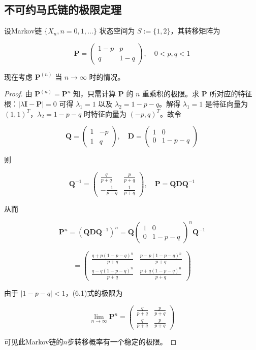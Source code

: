 \documentclass[lang=cn,10pt,thmcnt=section]{elegantbook}
\begin{document}
\subsection{不可约马氏链的极限定理}
\begin{example}
	设Markov链 \(\{X_n, n = 0, 1, \ldots\}\) 状态空间为 \( S := \{1, 2\} \)，其转移矩阵为

\[
\mathbf{P} = \left(
\begin{array}{cc}
1-p & p \\
q & 1-q
\end{array}
\right), \quad 0 < p, q < 1
\]

现在考虑 \(\mathbf{P}^{(n)}\) 当 \(n \to \infty\) 时的情况。

\end{example}
\begin{proof}
	由 \(\mathbf{P}^{(n)} = \mathbf{P}^n\) 知，只需计算 \(\mathbf{P}\) 的 \(n\) 重乘积的极限。求 \(\mathbf{P}\) 所对应的特征根：\(|\lambda \mathbf{I} - \mathbf{P}| = 0\) 可得 \(\lambda_1 = 1\) 以及 \(\lambda_2 = 1 - p - q\)。解得 \(\lambda_1 = 1\) 是特征向量为 \((1, 1)^T\)，\(\lambda_2 = 1 - p - q\) 时特征向量为 \((-p, q)^T\)。故令

\[
\mathbf{Q} = \left(
\begin{array}{cc}
1 & -p \\
1 & q
\end{array}
\right), \quad
\mathbf{D} = \left(
\begin{array}{cc}
1 & 0 \\
0 & 1 - p - q
\end{array}
\right)
\]

则

\[
\mathbf{Q}^{-1} = \left(
\begin{array}{cc}
\frac{q}{p+q} & \frac{p}{p+q} \\
-\frac{1}{p+q} & \frac{1}{p+q}
\end{array}
\right), \quad
\mathbf{P} = \mathbf{Q} \mathbf{D} \mathbf{Q}^{-1}
\]

从而

\[
\mathbf{P}^n = (\mathbf{Q} \mathbf{D} \mathbf{Q}^{-1})^n = \mathbf{Q} \left(
\begin{array}{cc}
1 & 0 \\
0 & 1 - p - q
\end{array}
\right)^n \mathbf{Q}^{-1}
\]

\[
= \left(
\begin{array}{cc}
\frac{q + p(1-p-q)^n}{p+q} & \frac{p - p(1-p-q)^n}{p+q} \\
\frac{q - q(1-p-q)^n}{p+q} & \frac{p + q(1-p-q)^n}{p+q}
\end{array}
\right)
\]

由于 \(|1 - p - q| < 1\)，(6.1)式的极限为

\[
\lim_{n \to \infty} \mathbf{P}^n = \left(
\begin{array}{cc}
\frac{q}{p+q} & \frac{p}{p+q} \\
\frac{q}{p+q} & \frac{p}{p+q}
\end{array}
\right)
\]

可见此Markov链的\(n\)步转移概率有一个稳定的极限。
\end{proof}
\end{document}
